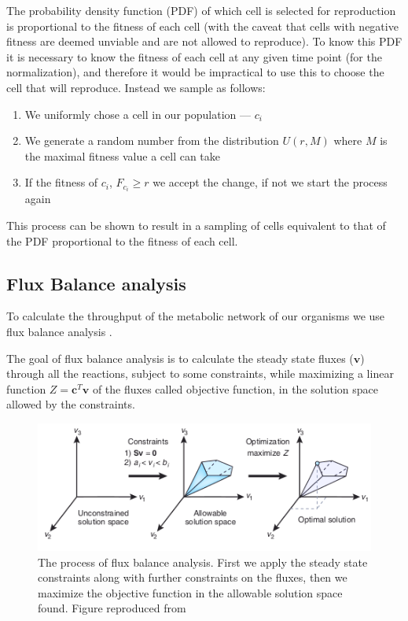 \documentclass[a4paper,12pt]{article}
\begin{document}
The probability density function (PDF) of which cell is selected for reproduction is proportional to the fitness of each cell (with the caveat that cells with negative fitness are deemed unviable and are not allowed to reproduce). To know this PDF it is necessary to know the fitness of each cell at any given time point (for the normalization), and therefore it would be impractical to use this to choose the cell that will reproduce. Instead we sample as follows: 
\begin{enumerate}
	\item We uniformly chose a cell in our population --- $c_i$
	\item We generate a random number from the distribution $U \left( r,M \right)$ where $M$ is the maximal fitness value a cell can take
	\item If the fitness of $c_i$,  $F_{c_i} \geq r$ we accept the change, if not we start the process again
\end{enumerate}

This process can be shown to result in a sampling of cells equivalent to that of the PDF proportional to the fitness of each cell.


\subsection{Flux Balance analysis}
\label{sub:Flux Balance analysis}


	To calculate the throughput of the metabolic network of our organisms we use flux balance analysis \cite{whatisfluxbalance}. 	

	The goal of flux balance analysis is to calculate the steady state fluxes ($\mathbf{v}$) through all the reactions, subject to some constraints, while maximizing a linear function $Z=\mathbf{c}^T \mathbf{v}$ of the fluxes called objective function, in the solution space allowed by the constraints. 

	\begin{figure}[htpb]
		\centering
		\includegraphics[width=0.8\linewidth]{fba_frompaper.png}
		\caption{The process of flux balance analysis. First we apply the steady state constraints along with further constraints on the fluxes, then we maximize the objective function in the allowable solution space found. Figure reproduced from \cite[]{whatisfluxbalance} }
		\label{fig:fluxbalance}
	\end{figure}
\end{document}
